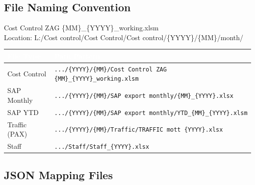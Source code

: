 \documentclass[11pt,a4paper]{article}
\begin{document}
\subsection{File Naming Convention}

\begin{codebox}
Cost Control ZAG \{MM\}\_\{YYYY\}\_working.xlsm\\
Location: L:/Cost control/Cost Control/Cost control/\{YYYY\}/\{MM\}/month/
\end{codebox}

\begin{center}
\begin{tabularx}{0.88\linewidth}{@{} l X @{}}
\toprule
\rowcolor{PrimaryBlue}
\textcolor{White}{\textbf{File Type}} & \textcolor{White}{\textbf{Path Pattern}} \\
\midrule
Cost Control  & \texttt{.../\{YYYY\}/\{MM\}/Cost Control ZAG \{MM\}\_\{YYYY\}\_working.xlsm} \\
SAP Monthly   & \texttt{.../\{YYYY\}/\{MM\}/SAP export monthly/\{MM\}\_\{YYYY\}.xlsx} \\
SAP YTD       & \texttt{.../\{YYYY\}/\{MM\}/SAP export monthly/YTD\_\{MM\}\_\{YYYY\}.xlsm} \\
Traffic (PAX) & \texttt{.../\{YYYY\}/\{MM\}/Traffic/TRAFFIC mott \{YYYY\}.xlsx} \\
Staff         & \texttt{.../Staff/Staff\_\{YYYY\}.xlsx} \\
\bottomrule
\end{tabularx}
\end{center}

\subsection{JSON Mapping Files}
\end{document}
